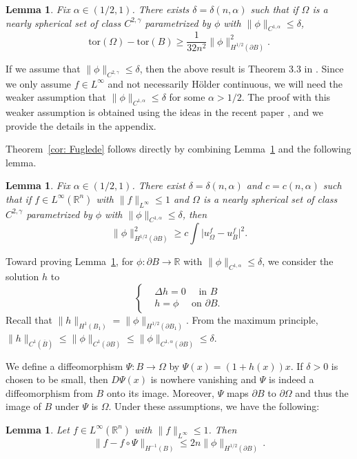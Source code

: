 \documentclass[10pt,a4paper]{amsart}
\numberwithin{equation}{section}
\newtheorem{lemma}[theorem]{Lemma}
\def\R{{\mathbb R}}
\def\W{\Omega}
\def\tor{\mathrm{tor}}
\begin{document}
\begin{lemma} \label{thm: spectral gap}
Fix  $\alpha \in (1/2,1)$. There exists $\delta = \delta(n,\alpha)$ such that if $\W$ is a nearly spherical set of class $C^{2,\gamma}$ parametrized by $\phi$ with {$\| \phi\|_{C^{1,\alpha}} \leq \delta$}, 
\[
\tor(\W) - \tor(B) \geq \frac{1}{32n^2} \| \phi \|_{H^{1/2}(\partial B)}^2. 
\]
\end{lemma}

  {  If we assume that $\| \phi\|_{C^{2,\gamma}} \leq \delta$, then the above result is Theorem 3.3 in \cite{BDV15}. Since we only assume $f \in L^{\infty}$ and not necessarily H\"older continuous, we will need the weaker assumption that $\| \phi\|_{C^{1,\alpha}} \leq \delta$ for some $\alpha>1/2$. The proof with this weaker assumption is obtained using the ideas in the recent paper \cite{p24}, and we provide the details in the appendix. }



Theorem~\ref{cor: Fuglede} follows directly by combining 
Lemma~\ref{thm: spectral gap} and the following lemma.
\begin{lemma}\label{lem: beta on NSS}
{Fix $\alpha \in (1/2,1)$. There exist $\delta = \delta(n,\alpha)$ and $c=c(n,\alpha)$ such that if $f \in L^\infty(\R^n)$ with $\| f\|_{L^\infty}\leq 1$ and $\W$ is a nearly spherical set of class $C^{2,\gamma}$ parametrized by $\phi$ with $\| \phi\|_{C^{1,\alpha}} \leq \delta$,} then
	\[
	\| \phi \|_{H^{1/2}(\partial B)}^2 \geq c \int \big| u_\W^f - u_{B}^f\big|^2 .
	\]
\end{lemma}


Toward proving Lemma~\ref{lem: beta on NSS},  for $\phi: \partial B\to \R$ with {$\| \phi\|_{C^{1,\alpha}} \leq \delta$}, we consider the solution $h$ to 
\begin{equation} \label{e:h}
 \begin{cases}
  &\Delta h=0 \quad \text{ in } B \\
  &h=\phi \quad \text{ on } \partial B. 
 \end{cases}
\end{equation}
Recall that $\| h\|_{H^1(B_1)}=\| \phi\|_{H^{1/2}(\partial B_1)}$. 
From the maximum principle,  $\|h \|_{C^1(\overline{B})} \leq \| \phi \|_{C^1(\partial B)} 
\leq \| \phi\|_{C^{1,\alpha}(\partial B)}\leq \delta$. 



We define a diffeomorphism  $\Psi: B\to \Omega$  by  $\Psi(x) = (1 + h(x) ) x$. If $\delta>0$ is chosen to be small, then $D\Psi(x)$ is nowhere vanishing and $\Psi$ is indeed a diffeomorphism from $B$ onto its image. Moreover, $\Psi$ maps $\partial B$ to $\partial \W$ and thus the image of $B$ under $\Psi$ is $\W$. Under these assumptions, we have the following:
\begin{lemma} \label{l:LNbound}
 Let $f \in L^{\infty}(\mathbb{R}^n)$ with $\| f\|_{L^\infty}\leq 1$. Then  
 \[
 \| f- f\circ \Psi \|_{H^{-1}(B)} \leq 2n\| \phi\|_{H^{1/2}(\partial B)}\,.
 \]
\end{lemma}
\end{document}
